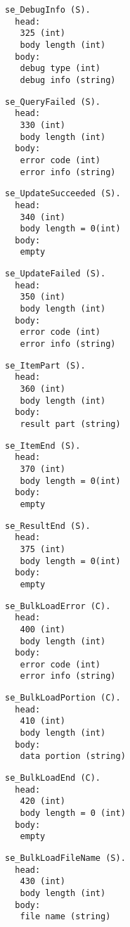 \documentclass[a4paper,12pt]{article}
\begin{document}
\begin{verbatim}
se_DebugInfo (S).
  head:
   325 (int)
   body length (int)
  body:
   debug type (int)
   debug info (string)
\end{verbatim}

\begin{verbatim}
se_QueryFailed (S).
  head:
   330 (int)
   body length (int)
  body:
   error code (int)
   error info (string)
\end{verbatim}

\begin{verbatim}
se_UpdateSucceeded (S).
  head:
   340 (int)
   body length = 0(int)
  body:
   empty
\end{verbatim}

\begin{verbatim}
se_UpdateFailed (S).
  head:
   350 (int)
   body length (int)
  body:
   error code (int)
   error info (string)
\end{verbatim}

\begin{verbatim}
se_ItemPart (S).
  head:
   360 (int)
   body length (int)
  body:
   result part (string)
\end{verbatim}

\begin{verbatim}
se_ItemEnd (S).
  head:
   370 (int)
   body length = 0(int)
  body:
   empty
\end{verbatim}

\begin{verbatim}
se_ResultEnd (S).
  head:
   375 (int)
   body length = 0(int)
  body:
   empty
\end{verbatim}

\begin{verbatim}
se_BulkLoadError (C).
  head:
   400 (int)
   body length (int)
  body:
   error code (int)
   error info (string)
\end{verbatim}

\begin{verbatim}
se_BulkLoadPortion (C).
  head:
   410 (int)
   body length (int)
  body:
   data portion (string)
\end{verbatim}

\begin{verbatim}
se_BulkLoadEnd (C).
  head:
   420 (int)
   body length = 0 (int)
  body:
   empty
\end{verbatim}

\begin{verbatim}
se_BulkLoadFileName (S).
  head:
   430 (int)
   body length (int)
  body:
   file name (string)
\end{verbatim}
\end{document}
